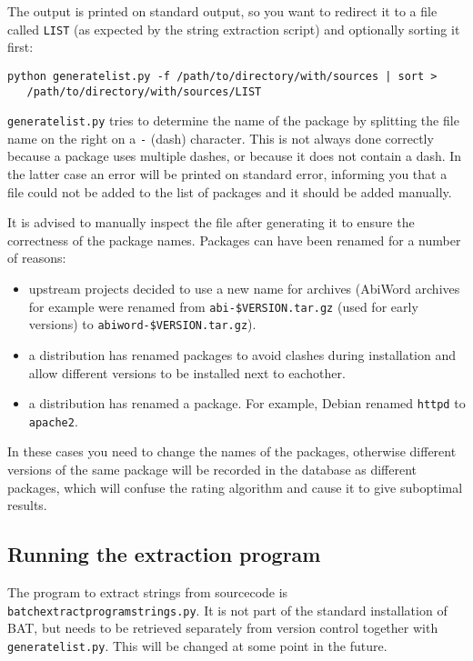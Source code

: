\documentclass[10pt]{article}
\begin{document}
The output is printed on standard output, so you want to redirect it to a file
called \texttt{LIST} (as expected by the string extraction script) and
optionally sorting it first:

\begin{verbatim}
python generatelist.py -f /path/to/directory/with/sources | sort >
   /path/to/directory/with/sources/LIST
\end{verbatim}


\texttt{generatelist.py} tries to determine the name of the package by
splitting the file name on the right on a \texttt{-} (dash)
character. This is not always done correctly because a package uses multiple
dashes, or because it does not contain a dash. In the latter case an error
will be printed on standard error, informing you that a file could not be
added to the list of packages and it should be added manually.

It is advised to manually inspect the file after generating it to ensure the
correctness of the package names. Packages can have been renamed for a number
of reasons:

\begin{itemize}
\item upstream projects decided to use a new name for archives (AbiWord
archives for example were renamed from \texttt{abi-\$VERSION.tar.gz} (used for
early versions) to \texttt{abiword-\$VERSION.tar.gz}).
\item a distribution has renamed packages to avoid clashes during installation
and allow different versions to be installed next to eachother.
\item a distribution has renamed a package. For example, Debian renamed
\texttt{httpd} to \texttt{apache2}.
\end{itemize}

In these cases you need to change the names of the packages, otherwise
different versions of the same package will be recorded in the database as
different packages, which will confuse the rating algorithm and cause it to
give suboptimal results.


\subsection{Running the extraction program}

The program to extract strings from sourcecode is
\texttt{batchextractprogramstrings.py}. It is not part of the standard
installation of BAT, but needs to be retrieved separately from version control
together with \texttt{generatelist.py}.  This will be changed at some point in
the future.
\end{document}
